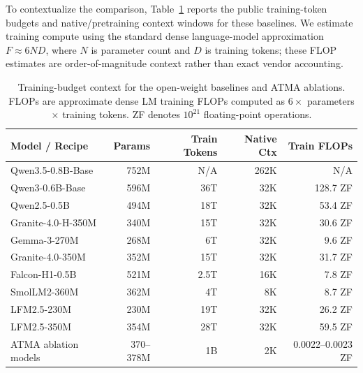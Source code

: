 \documentclass{article} %
\begin{document}
To contextualize the comparison, Table~\ref{table:open_weight_budgets} reports the public training-token budgets and native/pretraining context windows for these baselines. We estimate training compute using the standard dense language-model approximation $F \approx 6ND$, where $N$ is parameter count and $D$ is training tokens; these FLOP estimates are order-of-magnitude context rather than exact vendor accounting.

\begin{table}[h]
\centering
\scriptsize
\setlength{\tabcolsep}{4pt}
\begin{tabular}{lrrrr}
\toprule
\textbf{Model / Recipe} & \textbf{Params} & \textbf{Train Tokens} & \textbf{Native Ctx} & \textbf{Train FLOPs} \\
\midrule
Qwen3.5-0.8B-Base & 752M & N/A & 262K & N/A \\
Qwen3-0.6B-Base & 596M & 36T & 32K & 128.7 ZF \\
Qwen2.5-0.5B & 494M & 18T & 32K & 53.4 ZF \\
Granite-4.0-H-350M & 340M & 15T & 32K & 30.6 ZF \\
Gemma-3-270M & 268M & 6T & 32K & 9.6 ZF \\
Granite-4.0-350M & 352M & 15T & 32K & 31.7 ZF \\
Falcon-H1-0.5B & 521M & 2.5T & 16K & 7.8 ZF \\
SmolLM2-360M & 362M & 4T & 8K & 8.7 ZF \\
LFM2.5-230M & 230M & 19T & 32K & 26.2 ZF \\
LFM2.5-350M & 354M & 28T & 32K & 59.5 ZF \\
\midrule
ATMA ablation models & 370--378M & 1B & 2K & 0.0022--0.0023 ZF \\
\bottomrule
\end{tabular}
\caption{Training-budget context for the open-weight baselines and ATMA ablations. FLOPs are approximate dense LM training FLOPs computed as $6 \times$ parameters $\times$ training tokens. ZF denotes $10^{21}$ floating-point operations.}
\label{table:open_weight_budgets}
\end{table}
\end{document}
